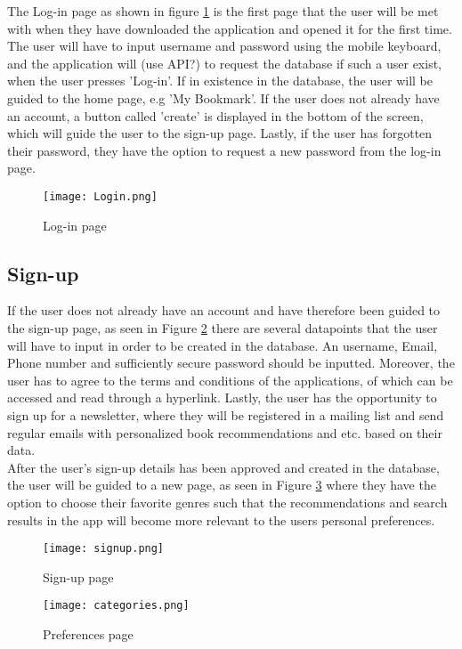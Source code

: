 \documentclass[conference]{IEEEtran}
\begin{document}
The Log-in page as shown in figure \ref{fig:login} is the first page that the user will be met with when they have downloaded the application and opened it for the first time. The user will have to input username and password using the mobile keyboard, and the application will (use API?) to request the database if such a user exist, when the user presses 'Log-in'. If in existence in the database, the user will be guided to the home page, e.g 'My Bookmark'. If the user does not already have an account, a button called 'create' is displayed in the bottom of the screen, which will guide the user to the sign-up page. Lastly, if the user has forgotten their password, they have the option to request a new password from the log-in page.

\begin{figure}[h]
    \centering
    \texttt{[image: Login.png]}
    \caption{Log-in page}
    \label{fig:login}
\end{figure}

\subsection{Sign-up}
If the user does not already have an account and have therefore been guided to the sign-up page, as seen in Figure \ref{fig:signup} there are several datapoints that the user will have to input in order to be created in the database. An username, Email, Phone number and sufficiently secure password should be inputted. Moreover, the user has to agree to the terms and conditions of the applications, of which can be accessed and read through a hyperlink. Lastly, the user has the opportunity to sign up for a newsletter, where they will be registered in a mailing list and send regular emails with personalized book recommendations and etc. based on their data. \\
After the user's sign-up details has been approved and created in the database, the user will be guided to a new page, as seen in Figure \ref{fig:categories} where they have the option to choose their favorite genres such that the recommendations and search results in the app will become more relevant to the users personal preferences. 


\begin{figure}[h]
    \centering
    \texttt{[image: signup.png]}
    \caption{Sign-up page}
    \label{fig:signup}
\end{figure}

\begin{figure}[h]
    \centering
    \texttt{[image: categories.png]}
    \caption{Preferences page}
    \label{fig:categories}
\end{figure}
\end{document}
